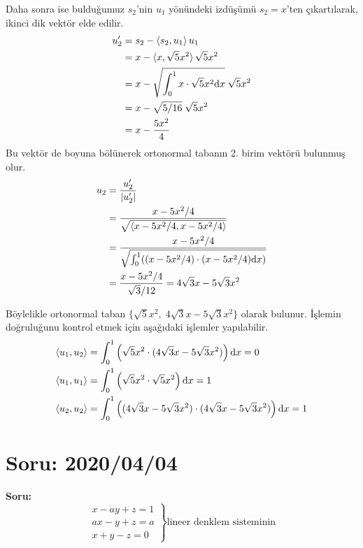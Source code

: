 \documentclass{article}
\numberwithin{equation}{section}
\begin{document}
Daha sonra ise bulduğumuz $s_2$'nin $u_1$ yönündeki izdüşümü $s_2 = x$'ten çıkartılarak, ikinci dik vektör elde edilir. 
%
\begin{align}
u_2^\prime &= s_2 - \braket{s_2,u_1} u_1 \nonumber \\
&= x - \braket{x, \sqrt{5}x^2} \sqrt{5}x^2 \nonumber \\
&= x - \sqrt{\int_{0}^{1}x\cdot \sqrt{5}x^2 \mathrm{d}x} \; \sqrt{5}x^2 \nonumber \\
&= x - \sqrt{5/16} \; \sqrt{5}x^2 \nonumber \\
&= x - \frac{5x^2}{4} 
\end{align}
%
Bu vektör de boyuna bölünerek ortonormal tabanın 2. birim vektörü bulunmuş olur.
%
\begin{align}
u_2 &= \frac{u_2^\prime}{|u_2^\prime|} \nonumber\\
&= \frac{x - 5x^2/4 }{\sqrt{\braket{x - 5x^2/4,x - 5x^2/4}}}\nonumber \\
&= \frac{x - 5x^2/4}{\sqrt{\int_{0}^{1}((x - 5x^2/4)\cdot (x - 5x^2/4) \mathrm{d}x)}} \nonumber \\
&= \frac{x - 5x^2/4}{\sqrt{3}/12} = 4\sqrt{3}x- 5\sqrt{3}x^2
\end{align}

Böylelikle ortonormal taban $\{\sqrt{5}x^2,\; 4\sqrt{3}x- 5\sqrt{3}x^2\}$ olarak bulunur. İşlemin doğruluğunu kontrol etmek için aşağıdaki işlemler yapılabilir. 
%
\begin{align}
\braket{u_1,u_2} &= \int_{0}^{1}\left(\sqrt{5}x^2 \cdot ( 4\sqrt{3}x- 5\sqrt{3}x^2)\right)\mathrm{d}x = 0 \\ 
\braket{u_1,u_1} &= \int_{0}^{1}\left(\sqrt{5}x^2 \cdot \sqrt{5}x^2\right)\mathrm{d}x = 1 \\ 
\braket{u_2,u_2} &= \int_{0}^{1}\left(( 4\sqrt{3}x- 5\sqrt{3}x^2) \cdot ( 4\sqrt{3}x- 5\sqrt{3}x^2)\right)\mathrm{d}x = 1 
\end{align}
 
 

\section{Soru: 2020/04/04}
\textbf{Soru:}
$$
\left. \begin{array}{r}
x-ay +z = 1\\
ax - y +z =a \\
x + y -z = 0 
\end{array} \right\} \text{lineer denklem sisteminin}
$$
\end{document}

